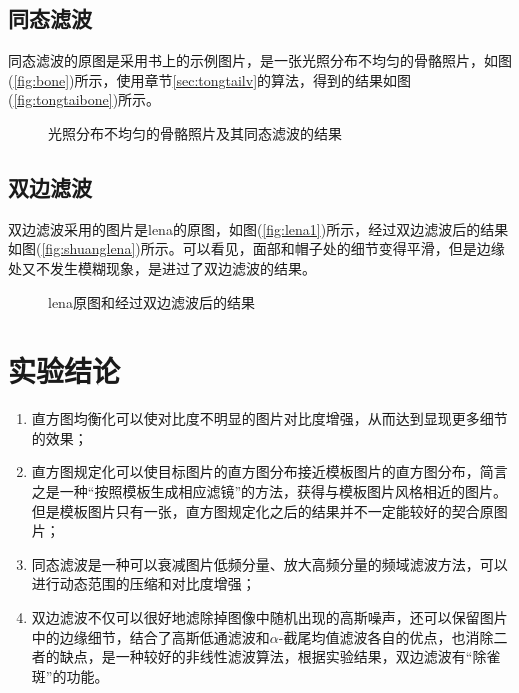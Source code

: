 \documentclass{hitreport}
\begin{document}
\subsection{同态滤波}

同态滤波的原图是采用书上的示例图片，是一张光照分布不均匀的骨骼照片，如图(\ref{fig:bone})所示，使用章节\ref{sec:tongtailv}的算法，得到的结果如图(\ref{fig:tongtaibone})所示。

\begin{figure}[htb]
	\centering
	\hspace{20pt}
	\caption{光照分布不均匀的骨骼照片及其同态滤波的结果}\label{fig:bone1}
\end{figure}

\subsection{双边滤波}

双边滤波采用的图片是lena的原图，如图(\ref{fig:lena1})所示，经过双边滤波后的结果如图(\ref{fig:shuanglena})所示。可以看见，面部和帽子处的细节变得平滑，但是边缘处又不发生模糊现象，是进过了双边滤波的结果。

\begin{figure}[htb]
	\centering
	\hspace{20pt}
	\caption{lena原图和经过双边滤波后的结果}\label{fig:shuang}
\end{figure}



\section{实验结论}

\begin{enumerate}
\item 直方图均衡化可以使对比度不明显的图片对比度增强，从而达到显现更多细节的效果；
\item 直方图规定化可以使目标图片的直方图分布接近模板图片的直方图分布，简言之是一种“按照模板生成相应滤镜”的方法，获得与模板图片风格相近的图片。但是模板图片只有一张，直方图规定化之后的结果并不一定能较好的契合原图片；
\item 同态滤波是一种可以衰减图片低频分量、放大高频分量的频域滤波方法，可以进行动态范围的压缩和对比度增强；
\item 双边滤波不仅可以很好地滤除掉图像中随机出现的高斯噪声，还可以保留图片中的边缘细节，结合了高斯低通滤波和$\alpha$-截尾均值滤波各自的优点，也消除二者的缺点，是一种较好的非线性滤波算法，根据实验结果，双边滤波有“除雀斑”的功能。
\end{enumerate}
\end{document}
